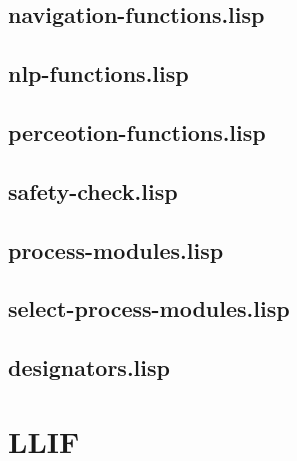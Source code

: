 \documentclass[main.tex]{subfiles}
\begin{document}
	    \subsection{navigation-functions.lisp}
	    \subsection{nlp-functions.lisp}
	    \subsection{perceotion-functions.lisp}
	    \subsection{safety-check.lisp}
	    \subsection{process-modules.lisp}
	    \subsection{select-process-modules.lisp}
	    \subsection{designators.lisp}

	  	\section{LLIF}

	\endgroup
\end{document}
